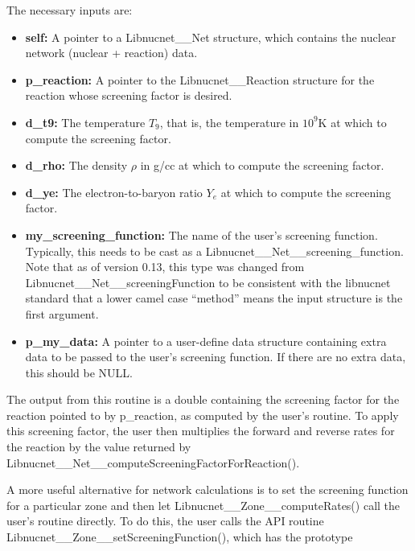 \documentclass{article}    %
\begin{document}
The necessary inputs are:

\begin{itemize}

\item {\bf self:} A pointer to a Libnucnet\_\_Net structure, which contains
the nuclear network (nuclear + reaction) data.

\item {\bf p\_reaction:}  A pointer to the Libnucnet\_\_Reaction structure
for the reaction whose screening factor is desired.

\item {\bf d\_t9:} The temperature $T_9$, that is, the temperature
in $10^9$K at which to compute the screening factor.

\item {\bf d\_rho:} The density $\rho$ in g/cc at which to compute the screening
factor.

\item {\bf d\_ye:} The electron-to-baryon ratio $Y_e$ at which to compute the
screening factor.

\item {\bf my\_screening\_function:} The name of the user's screening function.
Typically, this needs to be cast as a Libnucnet\_\_Net\_\_screening\_function.
Note that as of version 0.13, this type was changed from
Libnucnet\_\_Net\_\_screeningFunction to be consistent with the libnucnet
standard that a lower camel case ``method'' means the input structure is
the first argument.

\item {\bf p\_my\_data:}  A pointer to a user-define data structure containing
extra data to be passed to the user's screening function.  If there are
no extra data, this should be NULL.

\end{itemize}

The output from this routine is a double containing the screening factor
for the reaction pointed to by p\_reaction, as computed by the user's routine.
To apply this screening factor, the user then multiplies the forward and
reverse rates for the reaction by the value returned by
Libnucnet\_\_Net\_\_computeScreeningFactorForReaction().

A more useful alternative for network calculations
is to set the screening function for a particular zone and
then let Libnucnet\_\_Zone\_\_computeRates() call the user's routine
directly.  To do this, the user calls the API routine
Libnucnet\_\_Zone\_\_setScreeningFunction(), which has the prototype
\end{document}
